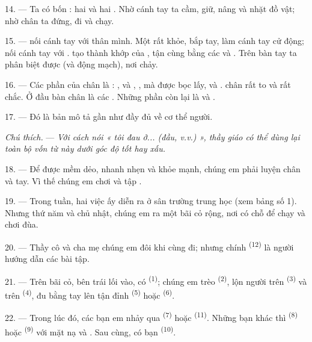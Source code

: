 14. --- Ta có bốn  : hai  và hai . Nhờ cánh
tay ta cầm, giữ, nâng và nhặt đồ vật; nhờ chân ta đứng, đi và chạy.

15. ---  nối cánh tay với thân mình. Một  rất khỏe, bắp
tay, làm cánh tay cử động;  nối cánh tay với .
 tạo thành khớp của , tận cùng bằng các  và . Trên bàn tay ta phân biệt được  (và động
mạch), nơi  chảy.

16. --- Các phần của chân là : ,  và ,
, mà  được  bọc lấy,  và
.  chân rất to và rất chắc. Ở đầu bàn chân là các
. Những phần còn lại là  và .

17. --- Đó là bản mô tả gần như đầy đủ về cơ thể người.

\textit{Chú thích.} --- \textit{Với cách nói « tôi đau ở... (đầu, v.v.) », thầy giáo có
thể dùng lại toàn bộ vốn từ này dưới góc độ}  \textit{tốt hay xấu.}

\VUsaut{5.0mm}
\VUsaut{2.4mm}
\VUsaut{3.0mm}

18. --- Để được mềm dẻo, nhanh nhẹn và khỏe mạnh, chúng em phải luyện chân và tay. Vì
thế chúng em chơi và tập .

19. --- Trong tuần, hai việc ấy diễn ra ở sân trường trung học (xem bảng số 1). Nhưng
thứ năm và chủ nhật, chúng em ra một bãi cỏ rộng, nơi có chỗ để chạy và chơi đùa.

20. --- Thầy cô và cha mẹ chúng em đôi khi cùng đi; nhưng chính \textsuperscript{(12)} là người hướng dẫn các bài tập.

21. --- Trên bãi cỏ, bên trái lối vào, có \textsuperscript{(1)}; chúng em trèo \textsuperscript{(2)}, lộn người
trên \textsuperscript{(3)} và trên \textsuperscript{(4)},
đu bằng tay lên tận đỉnh \textsuperscript{(5)} hoặc \textsuperscript{(6)}.

22. --- Trong lúc đó, các bạn em nhảy qua \textsuperscript{(7)} hoặc
\textsuperscript{(11)}. Những bạn khác thì \textsuperscript{(8)} hoặc \textsuperscript{(9)} với mặt nạ và
. Sau cùng, có bạn \textsuperscript{(10)}.

